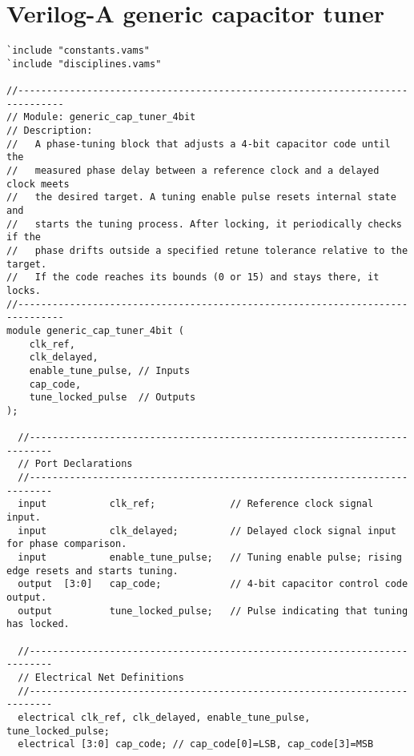 \section{Verilog-A generic capacitor tuner}
\label{app:verilog-a-code}


\begin{lstlisting}[caption={Verilog-A Generic Capacitor Tuner Implementation}]
`include "constants.vams"
`include "disciplines.vams"

//------------------------------------------------------------------------------
// Module: generic_cap_tuner_4bit
// Description:
//   A phase-tuning block that adjusts a 4-bit capacitor code until the
//   measured phase delay between a reference clock and a delayed clock meets
//   the desired target. A tuning enable pulse resets internal state and
//   starts the tuning process. After locking, it periodically checks if the
//   phase drifts outside a specified retune tolerance relative to the target.
//   If the code reaches its bounds (0 or 15) and stays there, it locks.
//------------------------------------------------------------------------------
module generic_cap_tuner_4bit (
    clk_ref,
    clk_delayed,
    enable_tune_pulse, // Inputs
    cap_code,
    tune_locked_pulse  // Outputs
);

  //--------------------------------------------------------------------------
  // Port Declarations
  //--------------------------------------------------------------------------
  input           clk_ref;             // Reference clock signal input.
  input           clk_delayed;         // Delayed clock signal input for phase comparison.
  input           enable_tune_pulse;   // Tuning enable pulse; rising edge resets and starts tuning.
  output  [3:0]   cap_code;            // 4-bit capacitor control code output.
  output          tune_locked_pulse;   // Pulse indicating that tuning has locked.

  //--------------------------------------------------------------------------
  // Electrical Net Definitions
  //--------------------------------------------------------------------------
  electrical clk_ref, clk_delayed, enable_tune_pulse, tune_locked_pulse;
  electrical [3:0] cap_code; // cap_code[0]=LSB, cap_code[3]=MSB


\end{lstlisting}
